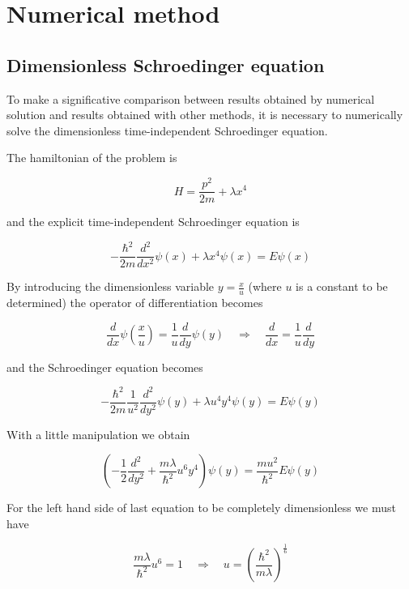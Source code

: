 \documentclass{article}
\begin{document}
\section{Numerical method}

\subsection{Dimensionless Schroedinger equation}
To make a significative comparison between results obtained by numerical solution and results obtained with other methods, it is necessary to numerically solve the dimensionless time-independent Schroedinger equation.

The hamiltonian of the problem is

\begin{equation}
H = \frac{p^2}{2m} + \lambda x^4
\end{equation}

and the explicit time-independent Schroedinger equation is

\begin{equation}
-\frac{\hbar^2}{2m} \frac{d^2}{dx^2} \psi(x) + \lambda x^4 \psi(x) = E \psi(x)
\end{equation}

By introducing the dimensionless variable \( y = \frac{x}{u} \) (where \( u \) is a constant to be determined) the operator of differentiation becomes

\begin{equation}
\frac{d}{dx} \psi \left( \frac{x}{u} \right) = \frac{1}{u} \frac{d}{dy} \psi(y) \quad \Rightarrow \quad \frac{d}{dx} = \frac{1}{u} \frac{d}{dy}
\end{equation}

and the Schroedinger equation becomes

\begin{equation}
-\frac{\hbar^2}{2m} \frac{1}{u^2} \frac{d^2}{dy^2} \psi(y) + \lambda u^4 y^4 \psi(y) = E \psi(y)
\end{equation}

With a little manipulation we obtain

\begin{equation}
\left( -\frac{1}{2}\frac{d^2}{dy^2} + \frac{m\lambda}{\hbar^2} u^6 y^4 \right) \psi(y) = \frac{mu^2}{\hbar^2} E \psi(y)
\end{equation}

For the left hand side of last equation to be completely dimensionless we must have

\begin{equation}
\frac{m\lambda}{\hbar^2} u^6 = 1 \quad \Rightarrow \quad u = \left( \frac{\hbar^2}{m\lambda} \right)^{\frac{1}{6}}
\end{equation}
\end{document}
